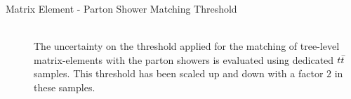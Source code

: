 \begin{myindentpar}
\begin{description}
    \item[Matrix Element - Parton Shower Matching Threshold] \hfill \\
    The uncertainty on the threshold applied for the matching of tree-level matrix-elements with the parton showers is evaluated using dedicated $t\bar{t}$ samples.
    This threshold has been scaled up and down with a factor $2$ in these samples.

    
    
        
   \end{description}
\end{myindentpar}

